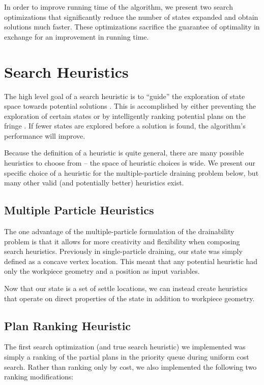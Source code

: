 In order to improve running time of the algorithm, we present two search optimizations that significantly reduce the number of states expanded and obtain solutions much faster. These optimizations sacrifice the guarantee of optimality in exchange for an improvement in running time.

\section{Search Heuristics}

The high level goal of a search heuristic is to ``guide'' the exploration of state space towards potential solutions \cite{AIBook}. This is accomplished by either preventing the exploration of certain states or by intelligently ranking potential plans on the fringe \cite{AIBook}. If fewer states are explored before a solution is found, the algorithm's performance will improve.

Because the definition of a heuristic is quite general, there are many possible heuristics to choose from -- the space of heuristic choices is wide. We present our specific choice of a heuristic for the multiple-particle draining problem below, but many other valid (and potentially better) heuristics exist.

\subsection{Multiple Particle Heuristics}

The one advantage of the multiple-particle formulation of the drainability problem is that it allows for more creativity and flexibility when composing search heuristics. Previously in single-particle draining, our state was simply defined as a concave vertex location. This meant that any potential heuristic had only the workpiece geometry and a position as input variables.

Now that our state is a set of settle locations, we can instead create heuristics that operate on direct properties of the state in addition to workpiece geometry.

\subsection{Plan Ranking Heuristic}

The first search optimization (and true search heuristic) we implemented was simply a ranking of the partial plans in the priority queue during uniform cost search. Rather than ranking only by cost, we also implemented the following two ranking modifications:

